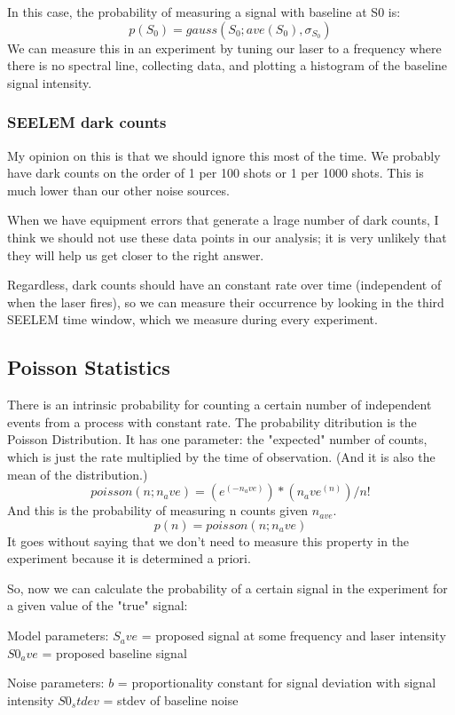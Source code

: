 \documentclass[12pt]{article}
\begin{document}
In this case, the probability of measuring a signal with baseline at S0 is:
\begin{equation}
  p(S_0) = gauss(S_0; ave(S_0),\sigma_{S_0})
\end{equation}
We can measure this in an experiment by tuning our laser to a frequency
where there is no spectral line, collecting data, and plotting a histogram
of the baseline signal intensity.

\subsubsection{SEELEM dark counts}

My opinion on this is that we should ignore this most of the time. We
probably have dark counts on the order of 1 per 100 shots or 1 per 1000
shots. This is much lower than our other noise sources.

When we have equipment errors that generate a lrage number of dark counts, I
think we should not use these data points in our analysis; it is very
unlikely that they will help us get closer to the right answer.

Regardless, dark counts should have an constant rate over time (independent
of when the laser fires), so we can measure their occurrence by looking in
the third SEELEM time window, which we measure during every experiment.

\subsection{Poisson Statistics}

There is an intrinsic probability for counting a certain number of
independent events from a process with constant rate. The probability
ditribution is the Poisson Distribution. It has one parameter: the
"expected" number of counts, which is just the rate multiplied by the time
of observation. (And it is also the mean of the distribution.)
\begin{equation}
  poisson (n; n_ave) = (e^(-n_ave)) * (n_ave^(n)) / n!
\end{equation}
And this is the probability of measuring n counts given $n_{ave}$.
\begin{equation}
  p(n) = poisson(n; n_ave)
\end{equation}
It goes without saying that we don't need to measure this property in the
experiment because it is determined a priori.

So, now we can calculate the probability of a certain signal in the
experiment for a given value of the "true" signal:

  Model parameters:
  $S_ave$  = proposed signal at some frequency and laser intensity
  $S0_ave$ = proposed baseline signal

  Noise parameters:
  $b$        = proportionality constant for signal deviation with signal
             intensity
  $S0_stdev$ = stdev of baseline noise
\end{document}
